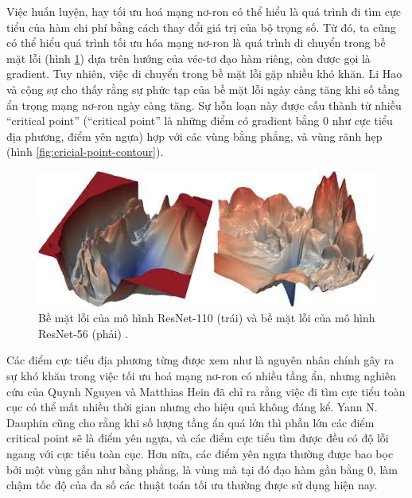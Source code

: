 Việc huấn luyện, hay tối ưu hoá mạng nơ-ron có thể hiểu là quá trình đi tìm cực tiểu của hàm chi phí bằng cách thay đổi giá trị của bộ trọng số. Từ đó, ta cũng có thể hiểu quá trình tối ưu hóa mạng nơ-ron là quá trình di chuyển trong bề mặt lỗi (hình \ref{fig:resnet-loss}) dựa trên hướng của véc-tơ đạo hàm riêng, còn được gọi là gradient. Tuy nhiên, việc di chuyển trong bề mặt lỗi gặp nhiều khó khăn. Li Hao và cộng sự \cite{li2018visualizing} cho thấy rằng sự phức tạp của bề mặt lỗi ngày càng tăng khi số tầng ẩn trọng mạng nơ-ron ngày càng tăng. Sự hỗn loạn này được cấu thành từ nhiều ``critical point'' (``critical point'' là những điểm có gradient bằng 0 như cực tiểu địa phương, điểm yên ngựa) hợp với các vùng bằng phẳng, và vùng rãnh hẹp (hình \ref{fig:cricial-point-contour}).

\begin{figure}[htp]
	\centering
	\includegraphics[width=120 mm]{images/resnet-loss.png}
	\caption{Bề mặt lỗi của mô hình ResNet-110 (trái) và bề mặt lỗi của mô hình ResNet-56 (phải) \cite{li2018visualizing}.}
	\label{fig:resnet-loss}
\end{figure}

Các điểm cực tiểu địa phương từng được xem như là nguyên nhân chính gây ra sự khó khăn trong việc tối ưu hoá mạng nơ-ron có nhiều tầng ẩn, nhưng nghiên cứu của Quynh Nguyen và Matthias Hein \cite{nguyen2017thelosssurface} đã chỉ ra rằng việc đi tìm cực tiểu toàn cục có thể mất nhiều thời gian nhưng cho hiệu quả không đáng kể. Yann N. Dauphin cũng cho rằng khi số lượng tầng ẩn quá lớn thì phần lớn các điểm critical point sẽ là điểm yên ngựa, và các điểm cực tiểu tìm được đều có độ lỗi ngang với cực tiểu toàn cục. Hơn nữa, các điểm yên ngựa thường được bao bọc bởi một vùng gần như bằng phẳng, là vùng mà tại đó đạo hàm gần bằng 0, làm chậm tốc độ của đa số các thuật toán tối ưu thường được sử dụng hiện nay.

